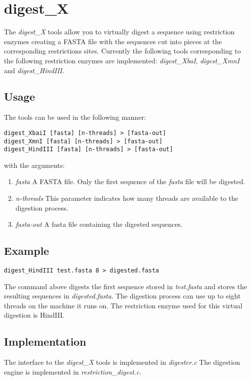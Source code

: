 \section{digest\_X}

The \emph{digest\_X} tools allow you to virtually digest a sequence
using restriction enzymes creating a FASTA file with the sequences
cut into pieces at the corresponding restrictions sites.
Currently the following tools corresponding to the following
restriction enzymes are implemented: \emph{digest\_XbaI}, \emph{digest\_XmnI}
and \emph{digest\_HindIII}. 

\subsection{Usage}
The tools can be used in the following manner:
\begin{lstlisting}
digest_XbaiI [fasta] [n-threads] > [fasta-out]
digest_XmnI [fasta] [n-threads] > [fasta-out]
digest_HindIII [fasta] [n-threads] > [fasta-out]
\end{lstlisting}
with the arguments:
\begin{enumerate}
\item \emph{fasta} A FASTA file. Only the first sequence of the \emph{fasta}
  file will be digested.
\item \emph{n-threads} This parameter indicates how many threads are
  available to the digestion process. 
\item \emph{fasta-out} A fasta file containing the digested sequences.
\end{enumerate}

\subsection{Example}
\begin{lstlisting}
digest_HindIII test.fasta 8 > digested.fasta
\end{lstlisting}
The command above digests the first sequence stored in
\emph{test.fasta} and stores the resulting
sequences in \emph{digested.fasta}. The digestion process can use up to eight
threads on the machine it runs on. The restriction enzyme used for this
virtual digestion is HindIII. 

\subsection{Implementation}
The interface to the \emph{digest\_X} tools is implemented in \emph{digester.c}
The digestion engine is implemented in \emph{restriction\_digest.c}. 
